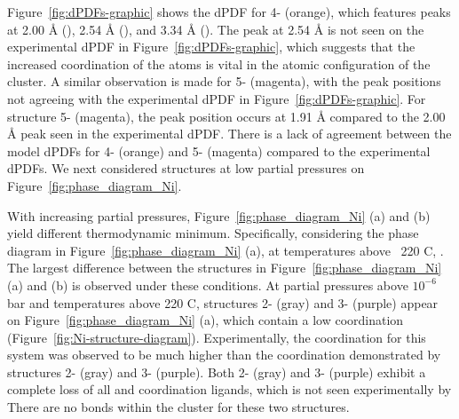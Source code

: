 Figure~\ref{fig:dPDFs-graphic} shows the dPDF for 4- (orange), which features peaks at 2.00 {\AA} (), 2.54 {\AA} (), and 3.34 {\AA} (). The  peak at 2.54 {\AA} is not seen on the experimental dPDF in Figure~\ref{fig:dPDFs-graphic}, which suggests that the increased coordination of the  atoms is vital in the atomic configuration of the  cluster. A similar observation is made for 5- (magenta), with the peak positions not agreeing with the experimental dPDF in Figure~\ref{fig:dPDFs-graphic}. For structure 5- (magenta), the  peak position occurs at 1.91 {\AA} compared to the 2.00 {\AA}  peak seen in the experimental dPDF.  There is a lack of agreement between the model dPDFs for 4- (orange) and 5- (magenta) compared to the experimental dPDFs. We next considered structures at low  partial pressures on Figure~\ref{fig:phase_diagram_Ni}.

With increasing  partial pressures, Figure~\ref{fig:phase_diagram_Ni} (a) and (b) yield different thermodynamic minimum. Specifically, considering the phase diagram in Figure~\ref{fig:phase_diagram_Ni} (a), at temperatures above ~220 \degree C, . The largest difference between the structures in Figure~\ref{fig:phase_diagram_Ni} (a) and (b) is observed under these conditions. At  partial pressures above $10^{-6}$ bar and temperatures above 220 \degree C, structures 2- (gray) and 3- (purple) appear on Figure~\ref{fig:phase_diagram_Ni} (a), which contain a low  coordination (Figure~\ref{fig:Ni-structure-diagram}). Experimentally, the  coordination for this system was observed to be much higher than the coordination demonstrated by structures 2- (gray) and 3- (purple). Both 2- (gray) and 3- (purple) exhibit a complete loss of all  and  coordination ligands, which is not seen experimentally by \citeauthor{PlateroPrats2017}\cite{PlateroPrats2017} There are no  bonds within the  cluster for these two structures. 



